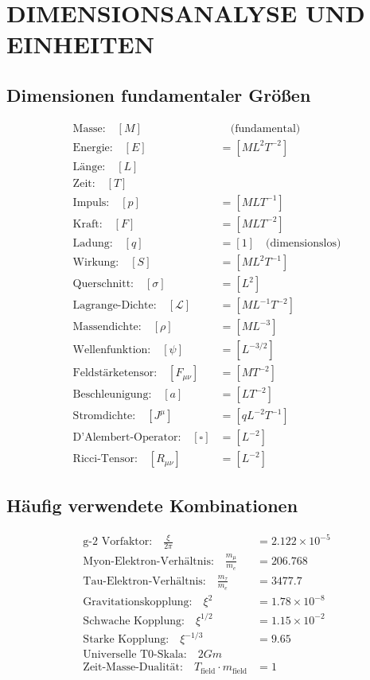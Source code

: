 \documentclass[12pt,a4paper]{article}
\begin{document}
	\section{DIMENSIONSANALYSE UND EINHEITEN}
	
	\subsection{Dimensionen fundamentaler Größen}
	\begin{align}
		\text{Masse:} \quad [M] &\quad \text{(fundamental)} \\
		\text{Energie:} \quad [E] &= [ML^2T^{-2}] \\
		\text{Länge:} \quad [L] & \\
		\text{Zeit:} \quad [T] & \\
		\text{Impuls:} \quad [p] &= [MLT^{-1}] \\
		\text{Kraft:} \quad [F] &= [MLT^{-2}] \\
		\text{Ladung:} \quad [q] &= [1] \quad \text{(dimensionslos)} \\
		\text{Wirkung:} \quad [S] &= [ML^2T^{-1}] \\
		\text{Querschnitt:} \quad [\sigma] &= [L^2] \\
		\text{Lagrange-Dichte:} \quad [\mathcal{L}] &= [ML^{-1}T^{-2}] \\
		\text{Massendichte:} \quad [\rho] &= [ML^{-3}] \\
		\text{Wellenfunktion:} \quad [\psi] &= [L^{-3/2}] \\
		\text{Feldstärketensor:} \quad [F_{\mu\nu}] &= [MT^{-2}] \\
		\text{Beschleunigung:} \quad [a] &= [LT^{-2}] \\
		\text{Stromdichte:} \quad [J^\mu] &= [qL^{-2}T^{-1}] \\
		\text{D'Alembert-Operator:} \quad [\square] &= [L^{-2}] \\
		\text{Ricci-Tensor:} \quad [R_{\mu\nu}] &= [L^{-2}]
	\end{align}
	
	\subsection{Häufig verwendete Kombinationen}
	\begin{align}
		\text{g-2 Vorfaktor:} \quad \frac{\xi}{2\pi} &= 2.122 \times 10^{-5} \\
		\text{Myon-Elektron-Verhältnis:} \quad \frac{m_\mu}{m_e} &= 206.768 \\
		\text{Tau-Elektron-Verhältnis:} \quad \frac{m_\tau}{m_e} &= 3477.7 \\
		\text{Gravitationskopplung:} \quad \xi^2 &= 1.78 \times 10^{-8} \\
		\text{Schwache Kopplung:} \quad \xi^{1/2} &= 1.15 \times 10^{-2} \\
		\text{Starke Kopplung:} \quad \xi^{-1/3} &= 9.65 \\
		\text{Universelle T0-Skala:} \quad 2Gm & \\
		\text{Zeit-Masse-Dualität:} \quad T_{\text{field}} \cdot m_{\text{field}} &= 1
	\end{align}
	
\end{document}
